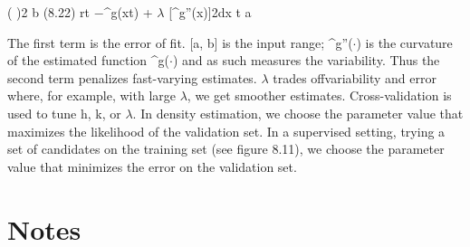 ( )2 b (8.22) rt $-$\textasciicircum{}g(xt) + $\lambda$ [\textasciicircum{}g''(x)]2dx t a

The first term is the error of fit. [a, b] is the input range; \textasciicircum{}g''($\cdot$) is the curvature of the estimated function \textasciicircum{}g($\cdot$) and as such measures the variability. Thus the second term penalizes fast-varying estimates. $\lambda$ trades offvariability and error where, for example, with large $\lambda$, we get smoother estimates. Cross-validation is used to tune h, k, or $\lambda$. In density estimation, we choose the parameter value that maximizes the likelihood of the validation set. In a supervised setting, trying a set of candidates on the training set (see figure 8.11), we choose the parameter value that minimizes the error on the validation set.

\section{Notes}

